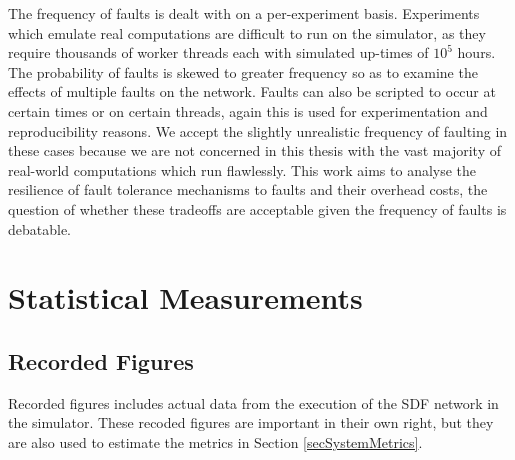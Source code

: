 The frequency of faults is dealt with on a per-experiment basis.
Experiments which emulate real computations are difficult to run on the simulator, as they require thousands of worker threads each with simulated up-times of $10^5$ hours.
The probability of faults is skewed to greater frequency so as to examine the effects of multiple faults on the network.
Faults can also be scripted to occur at certain times or on certain threads, again this is used for experimentation and reproducibility reasons.
We accept the slightly unrealistic frequency of faulting in these cases because we are not concerned in this thesis with the vast majority of real-world computations which run flawlessly.
This work aims to analyse the resilience of fault tolerance mechanisms to faults and their overhead costs, the question of whether these tradeoffs are acceptable given the frequency of faults is debatable.

\section{Statistical Measurements}
\label{secSystemStatistics}
\subsection{Recorded Figures}

Recorded figures includes actual data from the execution of the SDF network in the simulator.
These recoded figures are important in their own right, but they are also used to estimate the metrics in Section \ref{secSystemMetrics}.

